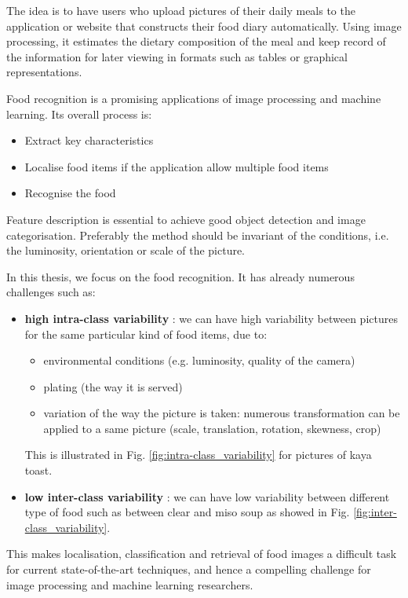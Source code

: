The idea is to have users who upload pictures of their daily meals to the application or website that constructs their food diary automatically. Using image processing, it estimates the dietary composition of the meal and keep record of the information for later viewing in formats such as tables or graphical representations.

Food recognition is a promising applications of image processing and machine learning. Its overall process is:
\begin{itemize}
    \item Extract key characteristics
    \item Localise food items if the application allow multiple food items
    \item Recognise the food
\end{itemize}

Feature description is essential to achieve good object detection and image categorisation. Preferably the method should be invariant of the conditions, i.e. the luminosity, orientation or scale of the picture.

In this thesis, we focus on the food recognition. It has already numerous challenges such as:
\begin{itemize}
    \item \textbf{high intra-class variability} : we can have high variability between pictures for the same particular kind of food items, due to:
    \begin{itemize}
        \item environmental conditions (e.g. luminosity, quality of the camera)
        \item plating (the way it is served)
        \item variation of the way the picture is taken: numerous transformation can be applied to a same picture (scale, translation, rotation, skewness, crop)
    \end{itemize}
    This is illustrated in Fig. \ref{fig:intra-class_variability} for pictures of kaya toast.
    
    \item \textbf{low inter-class variability} : we can have low variability between different type of food such as between clear and miso soup as showed in Fig. \ref{fig:inter-class_variability}.
\end{itemize}

This makes localisation, classification and retrieval of food images a difficult task for current state-of-the-art techniques, and hence a compelling challenge for image processing and machine learning researchers.

